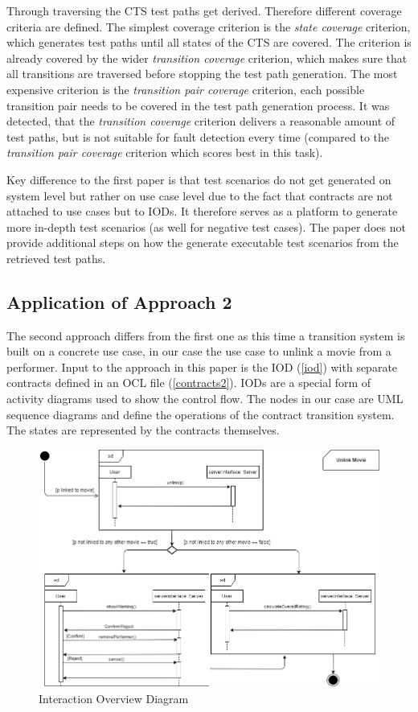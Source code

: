 Through traversing the CTS test paths get derived. Therefore different coverage criteria are defined. The simplest coverage criterion is the \textit{state coverage} criterion, which generates test paths until all states of the CTS are covered. The criterion is already covered by the wider \textit{transition coverage} criterion, which makes sure that all transitions are traversed before stopping the test path generation. The most expensive criterion is the \textit{transition pair coverage} criterion, each possible transition pair needs to be covered in the test path generation process. It was detected, that the \textit{transition coverage} criterion delivers a reasonable amount of test paths, but is not suitable for fault detection every time (compared to the \textit{transition pair coverage} criterion which scores best in this task). 

Key difference to the first paper is that test scenarios do not get generated on system level but rather on use case level due to the fact that contracts are not attached to use cases but to IODs. It therefore serves as a platform to generate more in-depth test scenarios (as well for negative test cases). The paper does not provide additional steps on how the generate executable test scenarios from the retrieved test paths. 

\subsection{Application of Approach 2}

The second approach differs from the first one as this time a transition system is built on a concrete use case, in our case the use case to unlink a movie from a performer. Input to the approach in this paper is the IOD (\autoref{iod}) with separate contracts defined in an OCL file (\autoref{contracts2}). IODs are a special form of activity diagrams used to show the control flow. The nodes in our case are UML sequence diagrams and define the operations of the contract transition system. The states are represented by the contracts themselves. 

\begin{figure}[h]
	\centering
	\includegraphics[width=\textwidth]{./images/iod.png}
	\caption{Interaction Overview Diagram}
	\label{iod}
\end{figure}

